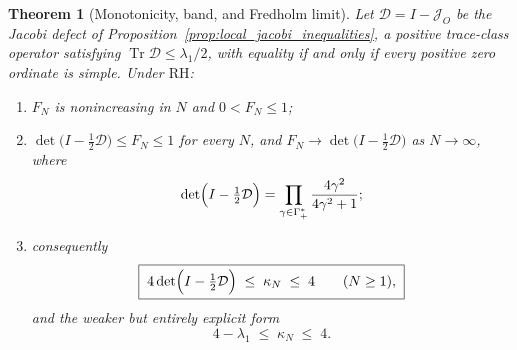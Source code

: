 \documentclass[11pt]{amsart}
\numberwithin{equation}{section}
\theoremstyle{plain}
\newtheorem{theorem}{Theorem}[section]
\theoremstyle{definition}
\theoremstyle{remark}
\newcommand{\RH}{\mathrm{RH}}
\newcommand{\Tr}{\operatorname{Tr}}
\begin{document}
\begin{theorem}[Monotonicity, band, and Fredholm limit]
\label{thm:margin_band}
Let $\mathcal D=I-\mathcal J_O$ be the Jacobi defect of Proposition~\ref{prop:local_jacobi_inequalities},
a positive trace-class operator satisfying $\Tr\mathcal D\le\lambda_1/2$, with equality if and only if every positive zero ordinate is simple.  Under $\RH$:
\begin{enumerate}[label=(\roman*)]
\item $F_N$ is nonincreasing in $N$ and $0<F_N\le1$;
\item $\det\bigl(I-\tfrac12\mathcal D\bigr)\le F_N\le1$ for every $N$, and
      $F_N\to\det\bigl(I-\tfrac12\mathcal D\bigr)$ as $N\to\infty$, where
      \begin{equation}
       \det\Bigl(I-\tfrac12\mathcal D\Bigr)
       =\prod_{\gamma\in\Gamma_+^*}\frac{4\gamma^2}{4\gamma^2+1};
       \label{eq:Fredholm_at_half}
      \end{equation}
\item consequently
      \begin{equation}
       \boxed{\;
       4\det\Bigl(I-\tfrac12\mathcal D\Bigr)\;\le\;\kappa_N\;\le\;4
       \qquad(N\ge1),\;}
       \label{eq:margin_band}
      \end{equation}
      and the weaker but entirely explicit form
      \begin{equation}
       4-\lambda_1\;\le\;\kappa_N\;\le\;4 .
       \label{eq:margin_band_explicit}
      \end{equation}
\end{enumerate}
\end{theorem}
\end{document}
